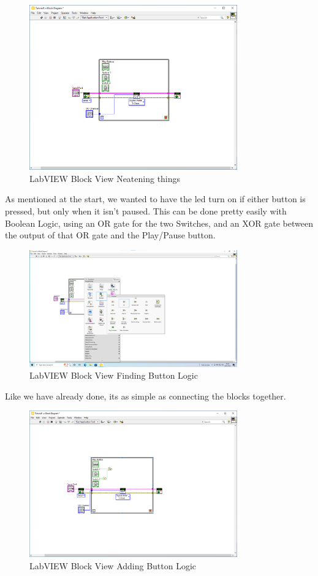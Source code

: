 \documentclass[a4paper,11pt]{report}
\begin{document}
\begin{figure}[H]
\centering
\includegraphics[width=0.8\textwidth]{screenshots/labview23}
\caption{LabVIEW Block View Neatening things}
\end{figure}

As mentioned at the start, we wanted to have the \gls{led} turn on if either button is pressed, but only when it isn't paused. This can be done pretty easily with Boolean Logic, using an OR gate for the two Switches, and an XOR gate between the output of that OR gate and the Play/Pause button.

\begin{figure}[H]
\centering
\includegraphics[width=0.8\textwidth]{screenshots/labview24}
\caption{LabVIEW Block View Finding Button Logic}
\end{figure}

Like we have already done, its as simple as connecting the blocks together.

\begin{figure}[H]
\centering
\includegraphics[width=0.8\textwidth]{screenshots/labview25}
\caption{LabVIEW Block View Adding Button Logic}
\end{figure}
\end{document}
